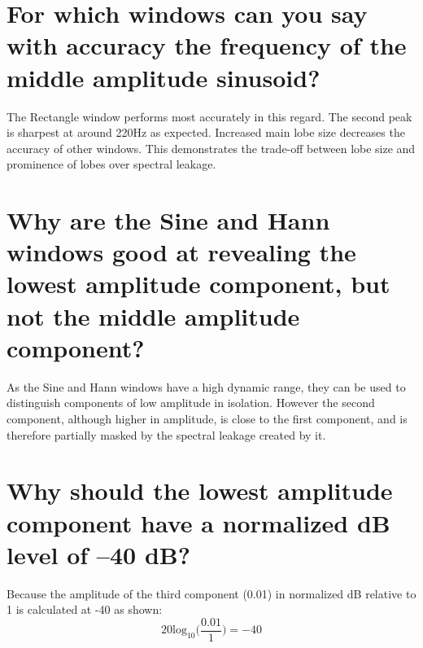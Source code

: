 \documentclass[titlepage]{scrartcl}
\begin{document}
\section{For which windows can you say with accuracy the frequency of the
middle amplitude sinusoid?}
The Rectangle window performs most accurately in this regard. The second peak
is sharpest at around 220Hz as expected. Increased main lobe size decreases the
accuracy of other windows. This demonstrates the trade-off between lobe size and
prominence of lobes over spectral leakage.

\section{Why are the Sine and Hann windows good at revealing the
lowest amplitude component, but not the middle amplitude component?}
As the Sine and Hann windows have a high dynamic range, they can be used to
distinguish components of low amplitude in isolation. However the second
component, although higher in amplitude, is close to the first component, and
is therefore partially masked by the spectral leakage created by it.

\section{Why should the lowest amplitude component have a normalized dB
level of –40 dB?}
Because the amplitude of the third component (0.01) in normalized dB relative
to 1 is calculated at -40 as shown: 
$$20\text{log}_{10}\Bigg(\frac{0.01}{1}\Bigg) = -40$$
\end{document}
